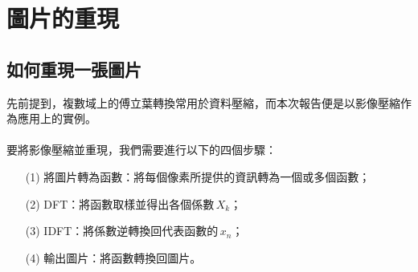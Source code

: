 \section{圖片的重現}
  \subsection{如何重現一張圖片}
  先前提到，複數域上的傅立葉轉換常用於資料壓縮，而本次報告便是以影像壓縮作為應用上的實例。
  \\\\
  要將影像壓縮並重現，我們需要進行以下的四個步驟：
  \begin{enumerate}
    \item[(1)]
    將圖片轉為函數：將每個像素所提供的資訊轉為一個或多個函數；

    \item[(2)]
    DFT：將函數取樣並得出各個係數\,\(X_k\)；

    \item[(3)]
    IDFT：將係數逆轉換回代表函數的\,\(x_n\)；

    \item[(4)]
    輸出圖片：將函數轉換回圖片。
  \end{enumerate}

